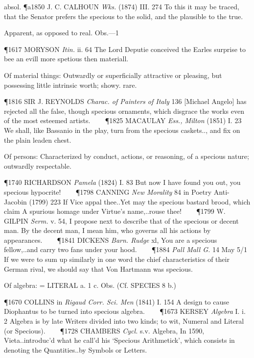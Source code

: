\begin{description}[wide, labelwidth=!, labelindent=0pt]
\begin{myenumerate}
absol. \P a1850 J. C. CALHOUN  \textit{Wks.} (1874) III. 274 To this it may be traced, that the Senator prefers the specious to the solid, and the plausible to the true.

 Apparent, as opposed to real. Obs.—1

\P 1617 MORYSON  \textit{Itin.} ii. 64 The Lord Deputie conceived the Earles surprise to bee an evill more spetious then materiall.

 Of material things: Outwardly or superficially attractive or pleasing, but possessing little intrinsic worth; showy. rare.

\P 1816 SIR J. REYNOLDS  \textit{Charac. of Painters of Italy} 136 [Michael Angelo] has rejected all the false, though specious ornaments, which disgrace the works even of the most esteemed artists.    
\P 1825 MACAULAY  \textit{Ess., Milton} (1851) I. 23 We shall, like Bassanio in the play, turn from the specious caskets.., and fix on the plain leaden chest.

 Of persons: Characterized by conduct, actions, or reasoning, of a specious nature; outwardly respectable.

\P 1740 RICHARDSON  \textit{Pamela} (1824) I. 83 But now I have found you out, you specious hypocrite!    
\P 1798 CANNING  \textit{New Morality} 84 in Poetry Anti-Jacobin (1799) 223 If Vice appal thee..Yet may the specious bastard brood, which claim A spurious homage under Virtue's name,..rouse thee!    
\P 1799 W. GILPIN  \textit{Serm.} v. 54, I propose next to describe that of the specious or decent man. By the decent man, I mean him, who governs all his actions by appearances.    
\P 1841 DICKENS  \textit{Barn. Rudge} xl, You are a specious fellow,..and carry two fans under your hood.    
\P 1884  \textit{Pall Mall G.} 14 May 5/1 If we were to sum up similarly in one word the chief characteristics of their German rival, we should say that Von Hartmann was specious.

 Of algebra: = LITERAL a. 1 c. Obs. (Cf. SPECIES 8 b.)

\P 1670 COLLINS in  \textit{Rigaud Corr. Sci. Men} (1841) I. 154 A design to cause Diophantus to be turned into specious algebra.    
\P 1673 KERSEY  \textit{Algebra} I. i. 2 Algebra is by late Writers divided into two kinds; to wit, Numeral and Literal (or Specious).    
\P 1728 CHAMBERS  \textit{Cycl.} s.v. Algebra, In 1590, Vieta..introduc'd what he call'd his ‘Specious Arithmetick’, which consists in denoting the Quantities..by Symbols or Letters.


\end{myenumerate}
\end{description}
